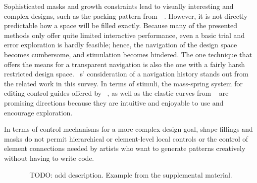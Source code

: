 Sophisticated masks and growth constraints lead to visually interesting and complex designs, such as the packing pattern from~\citeauthor*{saputra_2018_rde}~\cite{saputra_2018_rde}. However, it is not directly predictable how a space will be filled exactly. Because many of the presented methods only offer quite limited interactive performance, even a basic trial and error exploration is hardly feasible; hence, the navigation of the design space becomes cumbersome, and stimulation becomes hindered. The one technique \cite{santoni_2016_ggp} that offers the means for a transparent navigation is also the one with a fairly harsh restricted design space. \citeauthor*{santoni_2016_ggp}~\cite{santoni_2016_ggp}s' consideration of a navigation history stands out from the related work in this survey. In terms of stimuli, the mass-spring system for editing control guides offered by \citeauthor*{benes_2011_gpm}~\cite{benes_2011_gpm}, as well as the elastic curves from \citeauthor*{zehnder_2016_dso}~\cite{zehnder_2016_dso} are promising directions because they are intuitive and enjoyable to use and encourage exploration.

In terms of control mechanisms for a more complex design goal, shape fillings and masks do not permit hierarchical or element-level local controls or the control of element connections needed by artists who want to generate patterns creatively without having to write code.

\begin{figure}[H]
    \centering
    \label{fig:zehnder_2016_dso}
    \caption{\citeauthor*{zehnder_2016_dso}~\cite{zehnder_2016_dso} TODO: add description. Example from the supplemental material. \color{red}{Status rights: not started.}}
\end{figure}


